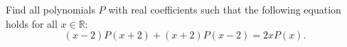 Find all polynomials $P$ with real coefficients such that the following equation holds for all $x \in \mathbb{R}$:
$$(x-2)P(x+2)+(x+2)P(x-2)=2xP(x).$$